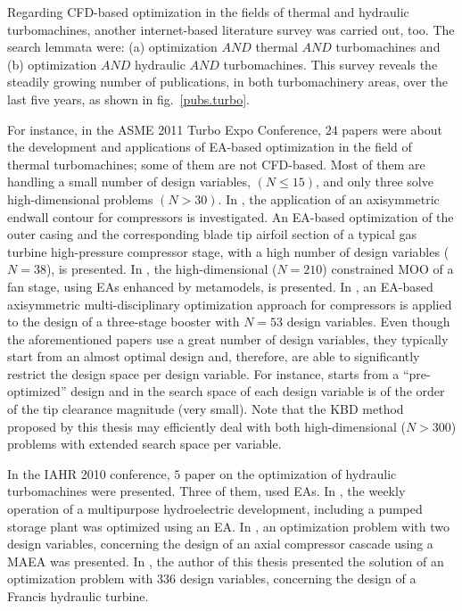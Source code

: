 Regarding CFD-based optimization in the fields of thermal and hydraulic turbomachines, another internet-based literature survey was carried out, too. The search lemmata were: (a) optimization $AND$ thermal $AND$ turbomachines and (b) optimization $AND$ hydraulic $AND$ turbomachines. This survey reveals the steadily growing number of publications, in both turbomachinery areas, over the last five years, as shown in fig.\ \ref{pubs.turbo}. 

For instance, in the ASME 2011 Turbo Expo Conference, $24$ papers were about the development and applications of EA-based optimization in the field of thermal turbomachines; some of them are not CFD-based. Most of them are handling a small number of design variables, $(N\!\leq\!15)$, and only three \cite{Georg2011,Marcel2011,Kevin2011} solve high-dimensional problems $(N\!>\!30)$. In \cite{Georg2011}, the application of an axisymmetric endwall contour for compressors is investigated. An EA-based optimization of the outer casing and the corresponding blade tip airfoil section of a typical gas turbine high-pressure compressor stage, with a high number of design variables ($N\!=\!38$), is presented. In \cite{Marcel2011}, the high-dimensional ($N\!=\!210$) constrained MOO of a fan stage, using EAs enhanced by metamodels, is presented. In \cite{Kevin2011}, an EA-based axisymmetric multi-disciplinary optimization approach for compressors is  applied to the design of a three-stage booster with $N\!=\!53$ design variables. Even though the aforementioned papers use a great number of design variables, they typically start from an almost optimal design and, therefore, are able to significantly restrict the design space per design variable. For instance,  \cite{Marcel2011} starts from a ``pre-optimized'' design and in \cite{Georg2011} the search space of each design variable is of the order of the tip clearance magnitude (very small). Note that the KBD method proposed by this thesis may efficiently deal with both high-dimensional ($N\!>\!300$) problems with extended search space per variable.      

In the IAHR 2010 conference, $5$ paper on the optimization of hydraulic turbomachines were presented. Three of them,  \cite{Raimunda2010,Kyriacou2010,Popa2010} used EAs. In \cite{Popa2010}, the weekly operation of a multipurpose
hydroelectric development, including a pumped storage plant was optimized using an EA. In \cite{Raimunda2010}, an optimization problem with two design variables, concerning the design of an axial compressor cascade using a MAEA was presented.  In \cite{Kyriacou2010}, the author of this thesis presented the solution of an optimization problem with $336$ design variables, concerning the design of a Francis hydraulic turbine. 


